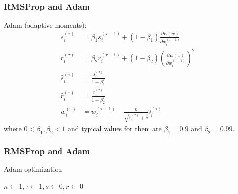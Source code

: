 \documentclass{beamer}
\begin{document}
\begin{frame}
    \frametitle{RMSProp and Adam}
    Adam (adaptive moments):
    \begin{align*}
        s^{(\tau)}_{i}&=\beta_{1}s^{(\tau-1)}_{i}+(1-\beta_{1})\frac{\partial{}E(w)}{\partial{}w^{(\tau-1)}_{i}} \\
        r^{(\tau)}_{i}&=\beta_{2}r^{(\tau-1)}_{i}+(1-\beta_{2})(\frac{\partial{}E(w)}{\partial{}w^{(\tau-1)}_{i}})^{2} \\
        \hat{s}^{(\tau)}_{i}&=\frac{s^{(\tau)}_{i}}{1-\beta_{1}^{\tau}} \\
        \hat{r}^{(\tau)}_{i}&=\frac{r^{(\tau)}_{i}}{1-\beta_{2}^{\tau}} \\
        w^{(\tau)}_{i}&=w^{(\tau-1)}_{i}-\frac{\eta}{\sqrt{\hat{r}^{(\tau)}_{i}}+\delta}\hat{s}^{(\tau)}_{i}
    \end{align*}
    where $0<\beta_{1},\beta_{2}<1$ and typical values for them are $\beta_{1}=0.9$ and $\beta_{2}=0.99$.
\end{frame}

\begin{frame}
    \frametitle{RMSProp and Adam}
    \begin{algorithm}[H]
        \caption{Adam optimization}
        $n\gets{}1,\tau\gets{}1,s\gets{}0,r\gets{}0$\;
        \;
    \end{algorithm}
\end{frame}
\end{document}

